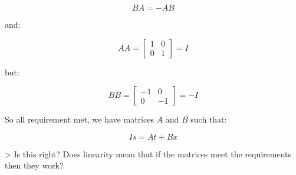 $$BA = -AB$$

and:

$$AA = \begin{bmatrix}1 & 0 \\ 0 & 1\end{bmatrix} = I$$

but:

$$BB = \begin{bmatrix}-1 & 0 \\ 0 & -1\end{bmatrix} = -I$$

So all requirement met, we have matrices $A$ and $B$ such that:

$$Is = At + Bx$$

> Is this right? Does linearity mean that if the matrices meet the requirements then they work?
